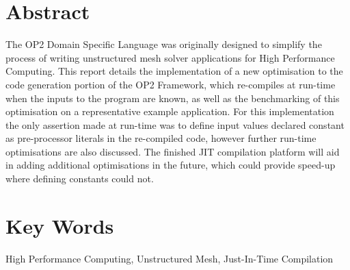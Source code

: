 
%
\vspace*{\fill}
\begin{adjustwidth}{55pt}{55pt}

\section*{Abstract}
The OP2 Domain Specific Language was originally designed to simplify the process of writing unstructured mesh solver applications for High Performance Computing. This report details the implementation of a new optimisation to the code generation portion of the OP2 Framework, which re-compiles at run-time when the inputs to the program are known, as well as the benchmarking of this optimisation on a representative example application. For this implementation the only assertion made at run-time was to define input values declared constant as pre-processor literals in the re-compiled code, however further run-time optimisations are also discussed. The finished JIT compilation platform will aid in adding additional optimisations in the future, which could provide speed-up where defining constants could not.

\section*{Key Words}
High Performance Computing, Unstructured Mesh, Just-In-Time Compilation
\end{adjustwidth}
\vspace*{\fill}
